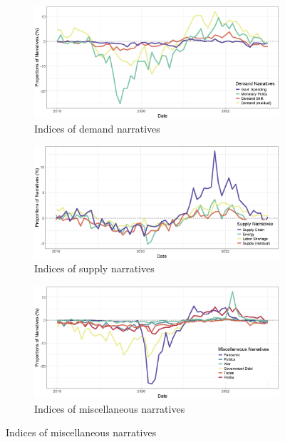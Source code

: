 \begin{figure}[H]
	\begin{subfigure}[b]{0.95\textwidth}
		\includegraphics[width=\textwidth]{figures/plot_sdemand.eps}
		\caption{Indices of demand narratives}
		\label{fig:sdemand}
	\end{subfigure}
	\hfill
	\begin{subfigure}[b]{0.95\textwidth}
		\includegraphics[width=\textwidth]{figures/plot_ssupply.eps}
		\caption{Indices of supply narratives}
		\label{fig:ssupply}
	\end{subfigure}
	\hfill
	\begin{subfigure}[b]{0.95\textwidth}
		\includegraphics[width=\textwidth]{figures/plot_sothers.eps}
		\caption{Indices of miscellaneous narratives}
		\label{fig:sothers}
	\end{subfigure}
\end{figure}

